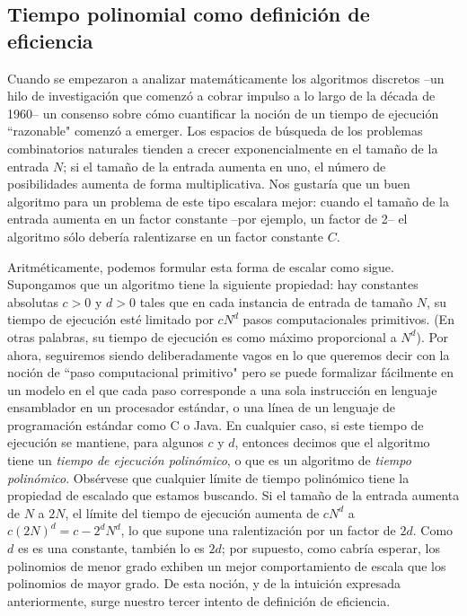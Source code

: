 \documentclass[a4paper, 12pt]{book}
\begin{document}
\subsection*{Tiempo polinomial como definición de eficiencia} 

Cuando se empezaron a analizar matemáticamente los algoritmos discretos --un hilo de investigación que comenzó a cobrar impulso a lo largo de la década de 1960-- un consenso sobre cómo cuantificar la noción de un tiempo de ejecución ``razonable" comenzó a emerger. Los espacios de búsqueda de los problemas combinatorios naturales tienden a crecer exponencialmente en el tamaño de la entrada $N$; si el tamaño de la entrada aumenta en uno, el número de posibilidades aumenta de forma multiplicativa. Nos gustaría que un buen algoritmo para un problema de este tipo escalara mejor: cuando el tamaño de la entrada aumenta en un factor constante --por ejemplo, un factor de 2-- el algoritmo sólo debería ralentizarse en un factor constante $C$.

Aritméticamente, podemos formular esta forma de escalar como sigue. Supongamos que un algoritmo tiene la siguiente propiedad: hay constantes absolutas $c>0$ y $d>0$ tales que en cada instancia de entrada de tamaño $N$, su tiempo de ejecución esté limitado por $cN^d$ pasos computacionales primitivos. (En otras palabras, su tiempo de ejecución es como máximo proporcional a $N^d$). Por ahora, seguiremos siendo deliberadamente vagos en lo que queremos decir con la noción de ``paso computacional primitivo" pero se puede formalizar fácilmente en un modelo en el que cada paso corresponde a una sola instrucción en lenguaje ensamblador en un procesador estándar, o una línea de un lenguaje de programación estándar como C o Java. 
En cualquier caso, si este tiempo de ejecución se mantiene, para algunos $c$ y $d$, entonces decimos que el algoritmo tiene un \textit{tiempo de ejecución polinómico}, o que es un algoritmo de \textit{tiempo polinómico}. Obsérvese que cualquier límite de tiempo polinómico tiene la propiedad de escalado que estamos buscando. Si el tamaño de la entrada aumenta de $N$ a $2N$, el límite del tiempo de ejecución aumenta de $cN^d$ a $c(2N)^d = c-2^dN^d$, lo que supone una ralentización por un factor de $2d$. Como $d$ es es una constante, también lo es $2d$; por supuesto, como cabría esperar, los polinomios de menor grado exhiben un mejor comportamiento de escala que los polinomios de mayor grado.
De esta noción, y de la intuición expresada anteriormente, surge nuestro tercer intento de definición de eficiencia.
\end{document}
